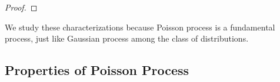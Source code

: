\documentclass[a4paper,10pt,english]{article}
\begin{document}
\begin{proof}
\end{proof}

We study these characterizations because Poisson process is a fundamental process, just like Gaussian process among the class of distributions.


\subsection{Properties of Poisson Process}
\end{document}
